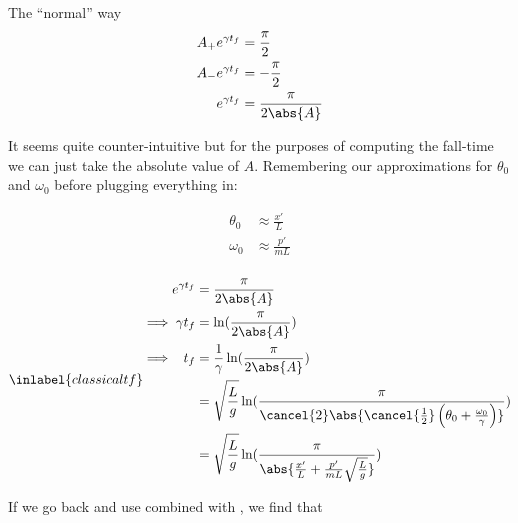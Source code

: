 \begin{answer}
\begin{answerpart}{The ``normal'' way}
    \begin{equation}
      \begin{split}
        A_+e^{\gamma t_f} &= \frac{\pi}{2}\\
        A_-e^{\gamma t_f} &= -\frac{\pi}{2}\\
        e^{\gamma t_f} &= \frac{\pi}{2\abs{A}}\\
      \end{split}
    \end{equation}

    It seems quite counter-intuitive but for the purposes of computing
    the fall-time we can just take the absolute value of $A$.
    Remembering our approximations for $\theta_0$ and $\omega_0$
    before plugging everything in:

    \begin{equation}
      \begin{split}
        \theta_0 &\approx \frac{x'}{L}\\
        \omega_0 &\approx \frac{p'}{mL}\\
      \end{split}
    \end{equation}
    
    \begin{equation}
      \inlabel{classicaltf}
      \begin{alignedat}{2}
        &&e^{\gamma t_f} &= \frac{\pi}{2\abs{A}}\\
        \implies&&\gamma t_f &= \ln(\frac{\pi}{2\abs{A}})\\
        \implies&&t_f &= \frac{1}{\gamma}\ln(\frac{\pi}{2\abs{A}})\\
        &&&= \sqrt{\frac{L}{g}}\ln(\frac{\pi}{\cancel{2}\abs{\cancel{\frac{1}{2}}\left(\theta_0 + \frac{\omega_0}{\gamma}\right)}})\\
        &&&= \sqrt{\frac{L}{g}}\ln(\frac{\pi}{\abs{\frac{x'}{L} + \frac{p'}{mL}\sqrt{\frac{L}{g}}}})\\
      \end{alignedat}
    \end{equation}

    If we go back and use  combined with , we
    find that


\end{answerpart}
\end{answer}
